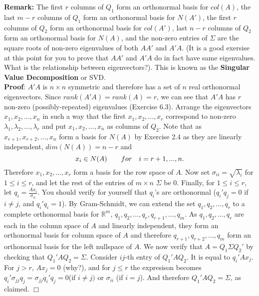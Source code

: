 \documentclass[12pt,oneside]{article}
\begin{document}
\noindent \textbf{Remark:} The first $r$ columns of $Q_1$ form an
orthonormal basis for $col(A)$, the last $m-r$ columns of $Q_1$ form
an orthonormal basis for $N(A')$, the first $r$ columns of $Q_2$ form
an orthonormal basis for $col(A')$, last $n-r$ columns of $Q_2$ form
an orthonormal basis for $N(A)$, and the non-zero entries of $\Sigma$
are the square roots of non-zero eigenvalues of both $AA'$ and
$A'A$. (It is a good exersise at this point for you to prove that
$AA'$ and $A'A$ do in fact have same eigenvalues. What is the
relationship between eigenvectors?). This is known as the \textbf{Singular
  Value Decomposition} or SVD.\\

\noindent \textbf{Proof}: $A'A$ is $n \times n$ symmetric and therefore has a
set of $n$ real orthonormal eigenvectors. Since $rank(A'A) = rank(A) =
r$, we can see that $A'A$ has $r$ non-zero (possibly-repeated)
eigenvalues (Exercise 6.3). Arrange the eigenvectors $x_1, x_2, \ldots, x_n$
in such a way that the first $x_1, x_2, \ldots, x_r$ correspond to
non-zero $\lambda_1, \lambda_2, \ldots, \lambda_r$ and put $x_1, x_2,
\ldots, x_n$ as columns of $Q_2$.  Note that as $x_{r+1}, x_{r + 2}, \ldots, x_n$ form a basis for $N(A)$ by Exercise 2.4 as they are linearly independent, $dim(N(A)) = n- r$ and \[x_i \in N(A) \hspace{10 pt} \hspace{10 pt} for \hspace{10 pt} i=r+1,...,n. \]
Therefore $x_1, x_2, \ldots, x_r$ form a basis for the row
space of $A$. Now set $\sigma_{ii} = \sqrt{\lambda_i}$ for $1 \leq i
\leq r$, and let the rest of the entries of $m \times n$ $\Sigma$ be
0. Finally, for $1 \leq i \leq r$, let $q_i =
\frac{Ax_i}{\sigma_{ii}}$. You should verify for yourself that $q_i$'s
are orthonormal ($q_i ' q_j = 0$ if $i \neq j$, and $q_i' q_i =
1$). By Gram-Schmidt, we can extend the set $q_1, q_2, \ldots, q_r$ to
a complete orthonormal basis for $\mathbb{R}^m$, $q_1, q_2, \ldots,
q_r, q_{r+1}, \ldots, q_m$. As $q_1, q_2, \ldots, q_r$ are each in the column space of $A$ and linearly independent, they form an orthonormal basis for column space of $A$ and therefore $q_{r+1}, q_{r+2}, \ldots, q_m$ form an orthonormal
basis for the left nullspace of $A$. We now verify that $A = Q_1 \Sigma
Q_2 '$ by checking that $Q_1' A Q_2 = \Sigma$. Consider $ij$-th entry
of $Q_1 ' A Q_2$. It is equal to $q_i ' Ax_j$. For $j > r$,
$Ax_j = 0$ (why?), and for $j \leq r$ the expresison becomes $q_i '
\sigma_{jj} q_j = \sigma_{jj} q_i ' q_j = 0$(if $i \neq j)$ or $\sigma_{ii}$ (if
$i = j$). And therefore $Q_1 ' A Q_2 = \Sigma$, as claimed. $\Box$\\
\end{document}
